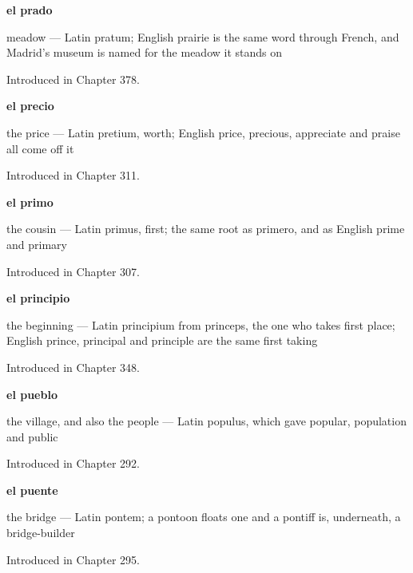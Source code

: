 \noindent\begin{minipage}[t]{\linewidth}
\raggedright
\textbf{el prado}\par
\small meadow — Latin pratum; English prairie is the same word through French, and Madrid's museum is named for the meadow it stands on\par
\footnotesize Introduced in Chapter 378.
\end{minipage}\par\medskip

\noindent\begin{minipage}[t]{\linewidth}
\raggedright
\textbf{el precio}\par
\small the price — Latin pretium, worth; English price, precious, appreciate and praise all come off it\par
\footnotesize Introduced in Chapter 311.
\end{minipage}\par\medskip

\noindent\begin{minipage}[t]{\linewidth}
\raggedright
\textbf{el primo}\par
\small the cousin --- Latin primus, first; the same root as primero, and as English prime and primary\par
\footnotesize Introduced in Chapter 307.
\end{minipage}\par\medskip

\noindent\begin{minipage}[t]{\linewidth}
\raggedright
\textbf{el principio}\par
\small the beginning — Latin principium from princeps, the one who takes first place; English prince, principal and principle are the same first taking\par
\footnotesize Introduced in Chapter 348.
\end{minipage}\par\medskip

\noindent\begin{minipage}[t]{\linewidth}
\raggedright
\textbf{el pueblo}\par
\small the village, and also the people — Latin populus, which gave popular, population and public\par
\footnotesize Introduced in Chapter 292.
\end{minipage}\par\medskip

\noindent\begin{minipage}[t]{\linewidth}
\raggedright
\textbf{el puente}\par
\small the bridge — Latin pontem; a pontoon floats one and a pontiff is, underneath, a bridge-builder\par
\footnotesize Introduced in Chapter 295.
\end{minipage}\par\medskip

